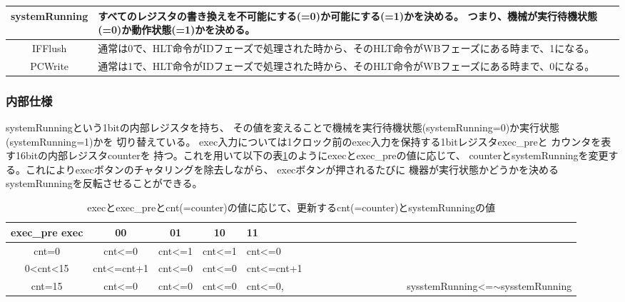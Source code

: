 \documentclass[a4j,titlepage]{jarticle}
\begin{document}
\begin{table}[H]
\begin{center}
\begin {tabularx}{150mm}{|c|X|}
         systemRunning & すべてのレジスタの書き換えを不可能にする(=0)か可能にする(=1)かを決める。
         つまり、機械が実行待機状態(=0)か動作状態(=1)かを決める。\\ \hline
         IFFlush & 通常は0で、HLT命令がIDフェーズで処理された時から、そのHLT命令がWBフェーズにある時まで、1になる。\\ \hline
         PCWrite & 通常は1で、HLT命令がIDフェーズで処理された時から、そのHLT命令がWBフェーズにある時まで、0になる。\\ \hline
    \end {tabularx}
    \end{center}
\end{table}

\subsubsection{内部仕様}
systemRunningという1bitの内部レジスタを持ち、
その値を変えることで機械を実行待機状態(systemRunning=0)か実行状態(systemRunning=1)かを
切り替えている。
exec入力については1クロック前のexec入力を保持する1bitレジスタexec\_preと
カウンタを表す16bitの内部レジスタcounterを
持つ。これを用いて以下の表\ref{execexecprecntsystemRunningRelation}のようにexecとexec\_preの値に応じて、
counterとsystemRunningを変更する。これによりexecボタンのチャタリングを除去しながら、
execボタンが押されるたびに
機器が実行状態かどうかを決めるsystemRunningを反転させることができる。


\begin{table}[H]
    \caption{execとexec\_preとcnt(=counter)の値に応じて、更新するcnt(=counter)とsystemRunningの値}
    \label{execexecprecntsystemRunningRelation}
    \begin{center}
    \begin {tabularx}{145mm}{|c||cccX|} \hline
         exec\_pre exec & 00 & 01 & 10 & 11 \\ \hline \hline
         cnt=0 & cnt\textless =0 & cnt\textless =1 & cnt\textless =1 & cnt\textless =0 \\ \hline
         0\textless cnt\textless 15 & cnt\textless =cnt+1 & cnt\textless =0 & cnt\textless =0 & cnt\textless =cnt+1 \\ \hline
         cnt=15 & cnt\textless =0 & cnt\textless =0 & cnt\textless =0 & cnt\textless =0,　　　　　　　　　　　　  sysstemRunning\textless =$\sim$sysstemRunning \\ \hline 

    \end {tabularx}
    \end{center}
\end{table}
\end{document}
